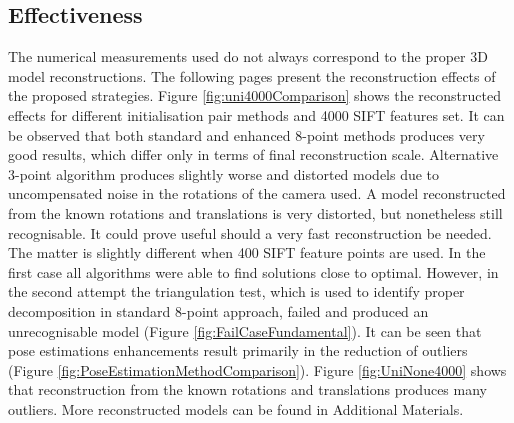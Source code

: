 \subsection{Effectiveness}
The numerical measurements used do not always correspond to the proper 3D model reconstructions. The following pages present the reconstruction effects of the proposed strategies. Figure \ref{fig:uni4000Comparison} shows the reconstructed effects for different initialisation pair methods and 4000 SIFT features set. It can be observed that both standard and enhanced 8-point methods produces very good results, which differ only in terms of final reconstruction scale. Alternative 3-point algorithm produces slightly worse and distorted models due to uncompensated noise in the rotations of the camera used. A model reconstructed from the known rotations and translations is very distorted, but nonetheless still recognisable. It could prove useful should a very fast reconstruction be needed.
\newline
The matter is slightly different when 400 SIFT feature points are used. In the first case all algorithms were able to find solutions close to optimal. However, in the second attempt the triangulation test, which is used to identify proper decomposition in standard 8-point approach, failed and produced an unrecognisable model (Figure \ref{fig:FailCaseFundamental}).
\newline
It can be seen that pose estimations enhancements result primarily in the reduction of outliers (Figure \ref{fig:PoseEstimationMethodComparison}).
\newline
Figure \ref{fig:UniNone4000} shows that reconstruction from the known rotations and translations produces many outliers. More reconstructed models can be found in Additional Materials.
